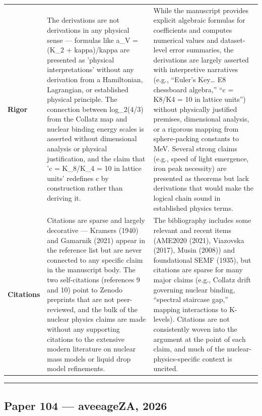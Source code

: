 \documentclass[11pt]{article}
\begin{document}
\begin{longtable}{@{} p{2.2cm} p{6.3cm} p{6.3cm} @{}}
\rowcolor{rowgray}
\textbf{Rigor} &
The derivations are not derivations in any physical sense — formulas like a\_V = (K\_2 + kappa)/kappa are presented as 'physical interpretations' without any derivation from a Hamiltonian, Lagrangian, or established physical principle. The connection between log\_2(4/3) from the Collatz map and nuclear binding energy scales is asserted without dimensional analysis or physical justification, and the claim that 'c = K\_8/K\_4 = 10 in lattice units' redefines c by construction rather than deriving it. &
While the manuscript provides explicit algebraic formulas for coefficients and computes numerical values and dataset-level error summaries, the derivations are largely asserted with interpretive narratives (e.g., “Euler’s Key… E8 chessboard algebra,” “c = K8/K4 = 10 in lattice units”) without physically justified premises, dimensional analysis, or a rigorous mapping from sphere-packing constants to MeV. Several strong claims (e.g., speed of light emergence, iron peak necessity) are presented as theorems but lack derivations that would make the logical chain sound in established physics terms. \\[6pt]

\textbf{Citations} &
Citations are sparse and largely decorative — Kramers (1940) and Gamarnik (2021) appear in the reference list but are never connected to any specific claim in the manuscript body. The two self-citations (references 9 and 10) point to Zenodo preprints that are not peer-reviewed, and the bulk of the nuclear physics claims are made without any supporting citations to the extensive modern literature on nuclear mass models or liquid drop model refinements. &
The bibliography includes some relevant and recent items (AME2020 (2021), Viazovska (2017), Musin (2008)) and foundational SEMF (1935), but citations are sparse for many major claims (e.g., Collatz drift governing nuclear binding, “spectral staircase gap,” mapping interactions to K-levels). Citations are not consistently woven into the argument at the point of each claim, and much of the nuclear-physics-specific context is uncited. \\

\end{longtable}

\bigskip
\hrule
\bigskip

\subsection*{Paper 104 --- aveeageZA, 2026}
\end{document}
